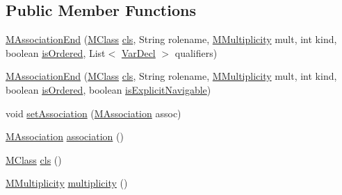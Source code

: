 \subsection*{Public Member Functions}
\begin{DoxyCompactItemize}
\item 
\hyperlink{classorg_1_1tzi_1_1use_1_1uml_1_1mm_1_1_m_association_end_a2badfd2823621dc461789664c6c1ff13}{M\-Association\-End} (\hyperlink{interfaceorg_1_1tzi_1_1use_1_1uml_1_1mm_1_1_m_class}{M\-Class} \hyperlink{classorg_1_1tzi_1_1use_1_1uml_1_1mm_1_1_m_association_end_af7360bac8e902047f9b3e3d045031e67}{cls}, String rolename, \hyperlink{classorg_1_1tzi_1_1use_1_1uml_1_1mm_1_1_m_multiplicity}{M\-Multiplicity} mult, int kind, boolean \hyperlink{classorg_1_1tzi_1_1use_1_1uml_1_1mm_1_1_m_association_end_ab3b11a01cde65e6f48d895feff416416}{is\-Ordered}, List$<$ \hyperlink{classorg_1_1tzi_1_1use_1_1uml_1_1ocl_1_1expr_1_1_var_decl}{Var\-Decl} $>$ qualifiers)
\item 
\hyperlink{classorg_1_1tzi_1_1use_1_1uml_1_1mm_1_1_m_association_end_a00bb374522e4fac264ae5841a72ebd94}{M\-Association\-End} (\hyperlink{interfaceorg_1_1tzi_1_1use_1_1uml_1_1mm_1_1_m_class}{M\-Class} \hyperlink{classorg_1_1tzi_1_1use_1_1uml_1_1mm_1_1_m_association_end_af7360bac8e902047f9b3e3d045031e67}{cls}, String rolename, \hyperlink{classorg_1_1tzi_1_1use_1_1uml_1_1mm_1_1_m_multiplicity}{M\-Multiplicity} mult, int kind, boolean \hyperlink{classorg_1_1tzi_1_1use_1_1uml_1_1mm_1_1_m_association_end_ab3b11a01cde65e6f48d895feff416416}{is\-Ordered}, boolean \hyperlink{classorg_1_1tzi_1_1use_1_1uml_1_1mm_1_1_m_association_end_a9b894e0659d51ca525629f6873156fda}{is\-Explicit\-Navigable})
\item 
void \hyperlink{classorg_1_1tzi_1_1use_1_1uml_1_1mm_1_1_m_association_end_a991622a6af6e9e7e338e544c8f6c720f}{set\-Association} (\hyperlink{interfaceorg_1_1tzi_1_1use_1_1uml_1_1mm_1_1_m_association}{M\-Association} assoc)
\item 
\hyperlink{interfaceorg_1_1tzi_1_1use_1_1uml_1_1mm_1_1_m_association}{M\-Association} \hyperlink{classorg_1_1tzi_1_1use_1_1uml_1_1mm_1_1_m_association_end_ae5886e7b8bd3f76d09d3ecd8c3588c26}{association} ()
\item 
\hyperlink{interfaceorg_1_1tzi_1_1use_1_1uml_1_1mm_1_1_m_class}{M\-Class} \hyperlink{classorg_1_1tzi_1_1use_1_1uml_1_1mm_1_1_m_association_end_af7360bac8e902047f9b3e3d045031e67}{cls} ()
\item 
\hyperlink{classorg_1_1tzi_1_1use_1_1uml_1_1mm_1_1_m_multiplicity}{M\-Multiplicity} \hyperlink{classorg_1_1tzi_1_1use_1_1uml_1_1mm_1_1_m_association_end_a400e0f671b5b892c79f0fb6def6d6c24}{multiplicity} ()

\end{DoxyCompactItemize}
